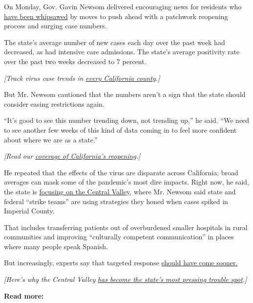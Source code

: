 On Monday, Gov. Gavin Newsom delivered encouraging news for residents
who
\href{https://www.nytimes3xbfgragh.onion/2020/07/23/us/california-covid-19-cases.html}{have
been whipsawed} by moves to push ahead with a patchwork reopening
process and surging case numbers.

The state's average number of new cases each day over the past week had
decreased, as had intensive care admissions. The state's average
positivity rate over the past two weeks decreased to 7 percent.

\emph{{[}Track virus case trends in}
\href{https://www.nytimes3xbfgragh.onion/interactive/2020/us/california-coronavirus-cases.html}{\emph{every
California county}}\emph{.{]}}

But Mr. Newsom cautioned that the numbers aren't a sign that the state
should consider easing restrictions again.

``It's good to see this number trending down, not trending up,'' he
said. ``We need to see another few weeks of this kind of data coming in
to feel more confident about where we are as a state.''

\emph{{[}Read our}
\href{https://www.nytimes3xbfgragh.onion/article/coronavirus-california-reopening-phases.html}{\emph{coverage
of California's reopening}}\emph{.{]}}

He repeated that the effects of the virus are disparate across
California; broad averages can mask some of the pandemic's most dire
impacts. Right now, he said, the state is
\href{https://www.nytimes3xbfgragh.onion/2020/07/28/us/newsom-coronavirus-valley.html}{focusing
on the Central Valley}, where Mr. Newsom said state and federal ``strike
teams'' are using strategies they honed when cases spiked in Imperial
County.

That includes transferring patients out of overburdened smaller
hospitals in rural communities and improving ``culturally competent
communication'' in places where many people speak Spanish.

But increasingly, experts say that targeted response
\href{https://www.nytimes3xbfgragh.onion/2020/07/30/us/coronavirus-california-health-equity.html}{should
have come sooner.}

\emph{{[}Here's why the Central Valley}
\href{https://www.nytimes3xbfgragh.onion/2020/07/28/us/newsom-coronavirus-valley.html}{\emph{has
become the state's most pressing trouble spot}}\emph{.{]}}

\textbf{Read more:}

